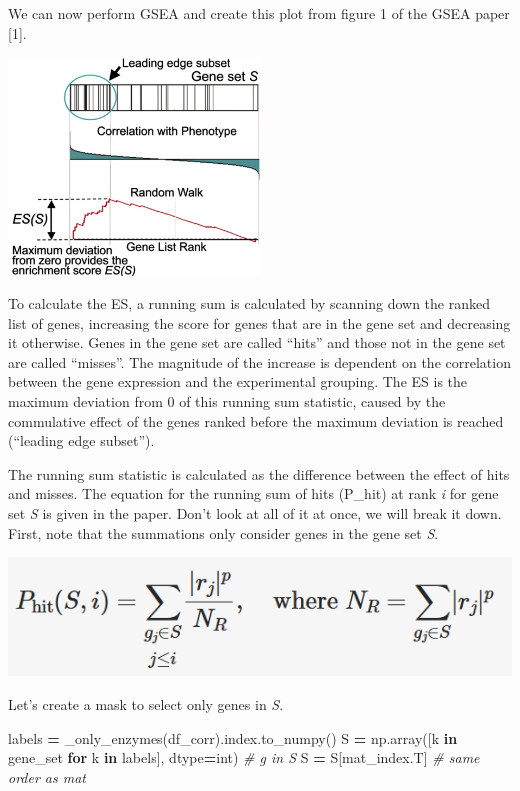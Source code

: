 \documentclass[
]{book}
\newenvironment{Shaded}{\begin{snugshade}}{\end{snugshade}}
\newcommand{\BuiltInTok}[1]{#1}
\newcommand{\CommentTok}[1]{\textcolor[rgb]{0.56,0.35,0.01}{\textit{#1}}}
\newcommand{\ControlFlowTok}[1]{\textcolor[rgb]{0.13,0.29,0.53}{\textbf{#1}}}
\newcommand{\KeywordTok}[1]{\textcolor[rgb]{0.13,0.29,0.53}{\textbf{#1}}}
\newcommand{\NormalTok}[1]{#1}
\newcommand{\OperatorTok}[1]{\textcolor[rgb]{0.81,0.36,0.00}{\textbf{#1}}}
\begin{document}
We can now perform GSEA and create this plot from figure 1 of the GSEA paper {[}1{]}.

\includegraphics[width=0.5\textwidth,height=\textheight]{img/lab4/gsea.png}

To calculate the ES, a running sum is calculated by scanning down the ranked list of genes, increasing the score for genes that
are in the gene set and decreasing it otherwise. Genes in the gene set are called ``hits'' and those not in the gene set are called ``misses''.
The magnitude of the increase is dependent on the correlation between the gene
expression and the experimental grouping. The ES is the maximum deviation from 0 of this running sum statistic, caused by the commulative effect
of the genes ranked before the maximum deviation is reached (``leading edge subset'').

The running sum statistic is calculated as the difference between the effect of hits and misses.
The equation for the running sum of hits (P\_hit) at rank \emph{i}
for gene set \emph{S} is given in the paper. Don't look at all of it at once, we will break it down.
First, note that the summations only consider genes in the gene set \emph{S}.

\includegraphics{img/lab4/gsea_phit.png}

Let's create a mask to select only genes in \emph{S}.

\begin{Shaded}
\begin{Highlighting}[numbers=left,,]
\NormalTok{labels }\OperatorTok{=}\NormalTok{ \_only\_enzymes(df\_corr).index.to\_numpy()}
\NormalTok{S }\OperatorTok{=}\NormalTok{ np.array([k }\KeywordTok{in}\NormalTok{ gene\_set }\ControlFlowTok{for}\NormalTok{ k }\KeywordTok{in}\NormalTok{ labels], dtype}\OperatorTok{=}\BuiltInTok{int}\NormalTok{) }\CommentTok{\# g in S}
\NormalTok{S }\OperatorTok{=}\NormalTok{ S[mat\_index.T] }\CommentTok{\# same order as mat}
\end{Highlighting}
\end{Shaded}
\end{document}
